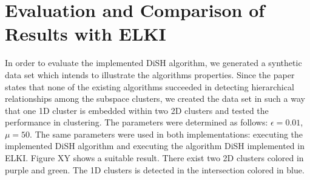 \documentclass{article}
\begin{document}
\section{Evaluation and Comparison of Results with ELKI}

In order to evaluate the implemented DiSH algorithm, we generated a synthetic data set which intends to illustrate the algorithms properties. Since the paper states that none of the existing algorithms succeeded in detecting hierarchical relationships among the subspace clusters, we created the data set in such a way that one 1D cluster is embedded within two 2D clusters and tested the performance in clustering. The parameters were determined as follows: $\epsilon = 0.01$, $\mu = 50$. The same parameters were used in both implementations: executing the implemented DiSH algorithm and executing the algorithm DiSH implemented in ELKI. Figure XY shows a suitable result. There exist two 2D clusters colored in purple and green. The 1D clusters is detected in the intersection colored in blue. 


\begin{figure}[h!]
\centering
\end{figure}
\end{document}
